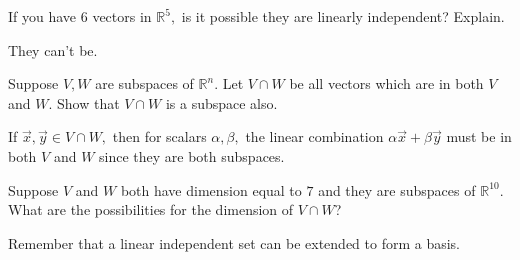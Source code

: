 \documentclass{ximera}
\begin{document}
\begin{problem}\label{prb:5.25} If you have $6$ vectors in $\mathbb{R}^{5},$ is it possible they are
linearly independent? Explain.
\begin{hint}
They can't be.
\end{hint}
\end{problem}



\begin{problem}\label{prb:5.27} Suppose $V, W$ are subspaces of $\mathbb{R}^{n}.$ Let $V\cap W$
be all vectors which are in both $V$ and $W$. Show that $V \cap W$ is a subspace also.
\begin{hint}
If $\vec{x}, \vec{y}\in V\cap W,$ then for scalars $\alpha
,\beta ,$ the linear combination $\alpha \vec{x}+\beta \vec{y}$ must
be in both $V$ and $W$ since they are both subspaces.
\end{hint}
\end{problem}

\begin{problem}\label{prb:5.28} Suppose $V$ and $W$ both have dimension equal to $7$ and they are
subspaces of $\mathbb{R}^{10}.$ What are the possibilities for the dimension
of $V\cap W$? 
\begin{hint}
Remember that a linear independent set can be extended to form a basis.
\end{hint}
\end{problem}
\end{document}

